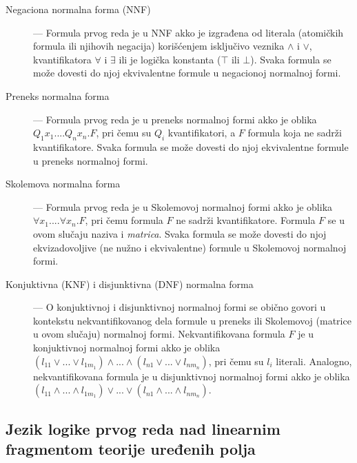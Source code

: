 \documentclass[a4paper,10pt]{article}
\begin{document}
\begin{description}
    \item[Negaciona normalna forma (NNF)] --- Formula prvog reda je u NNF akko je izgrađena od literala (atomičkih formula ili njihovih negacija) korišćenjem isključivo veznika $\land$ i $\lor$, kvantifikatora $\forall$ i $\exists$ ili je logička konstanta ($\top$ ili $\bot$). Svaka formula se može dovesti do njoj ekvivalentne formule u negacionoj normalnoj formi.
    \item[Preneks normalna forma] --- Formula prvog reda je u preneks normalnoj formi akko je oblika $Q_1x_1. ... Q_nx_n.F$, pri čemu su $Q_i$ kvantifikatori, a $F$ formula koja ne sadrži kvantifikatore. Svaka formula se može dovesti do njoj ekvivalentne formule u preneks normalnoj formi.
    \item[Skolemova normalna forma] --- Formula prvog reda je u Skolemovoj normalnoj formi akko je oblika $\forall x_1. ... \forall x_n.F$, pri čemu formula $F$ ne sadrži kvantifikatore. Formula $F$ se u ovom slučaju naziva i \textit{matrica}. Svaka formula se može dovesti do njoj ekvizadovoljive (ne nužno i ekvivalentne) formule u Skolemovoj normalnoj formi.
    \item[Konjuktivna (KNF) i disjunktivna (DNF) normalna forma] --- O konjuktivnoj i disjunktivnoj normalnoj formi se obično govori u kontekstu nekvantifikovanog dela formule u preneks ili Skolemovoj (matrice u ovom slučaju) normalnoj formi. Nekvantifikovana formula $F$ je u konjuktivnoj normalnoj formi akko je oblika $(l_{11} \lor ... \lor l_{1m_1}) \land ... \land (l_{n1} \lor ... \lor l_{nm_n})$, pri čemu su $l_i$ literali. Analogno, nekvantifikovana formula je u disjunktivnoj normalnoj formi akko je oblika $(l_{11} \land ... \land l_{1m_1}) \lor ... \lor (l_{n1} \land ... \land l_{nm_n})$.
\end{description}

\subsection{Jezik logike prvog reda nad linearnim fragmentom teorije uređenih polja}
\label{subsec:teorija_uredjenih_polja}
\end{document}
